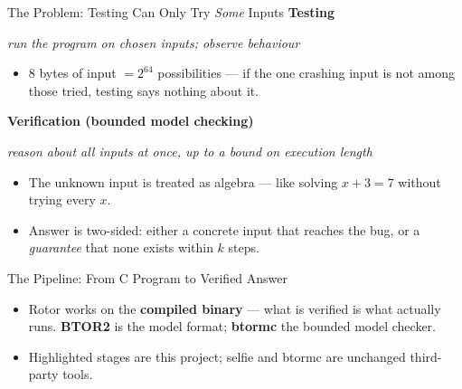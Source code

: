 \documentclass[aspectratio=169]{beamer}
\newcommand{\deflab}[2]{%
  \textbf{#1}\par\vspace{0.05cm}%
  {\color{blue!55!black}\itshape #2}\par\vspace{0.05cm}}
\newcommand{\keylab}[1]{\textbf{\color{blue!55!black}#1}}
\begin{document}
\begin{frame}{The Problem: Testing Can Only Try \emph{Some} Inputs}
  \deflab{Testing}{run the program on chosen inputs; observe behaviour}
  \begin{itemize}\setlength\itemsep{0.2em}
    \item 8 bytes of input $= 2^{64}$ possibilities --- if the one
          crashing input is not among those tried, testing says
          nothing about it.
  \end{itemize}
  \vspace{0.1cm}
  \deflab{Verification (bounded model checking)}{reason about \emph{all}
          inputs at once, up to a bound on execution length}
  \begin{itemize}\setlength\itemsep{0.2em}
    \item The unknown input is treated as algebra --- like solving
          $x + 3 = 7$ without trying every $x$.
    \item Answer is two-sided: either a concrete input that reaches the
          bug, or a \emph{guarantee} that none exists within $k$ steps.
  \end{itemize}
\end{frame}

\begin{frame}{The Pipeline: From C Program to Verified Answer}
  \begin{center}
  \end{center}
  \vspace{0.1cm}
  \begin{itemize}\setlength\itemsep{0.4em}
    \item Rotor works on the \keylab{compiled binary} --- what is
          verified is what actually runs. \keylab{BTOR2} is the model
          format; \keylab{btormc} the bounded model checker.
    \item Highlighted stages are this project; selfie and btormc are
          unchanged third-party tools.
  \end{itemize}
\end{frame}
\end{document}
